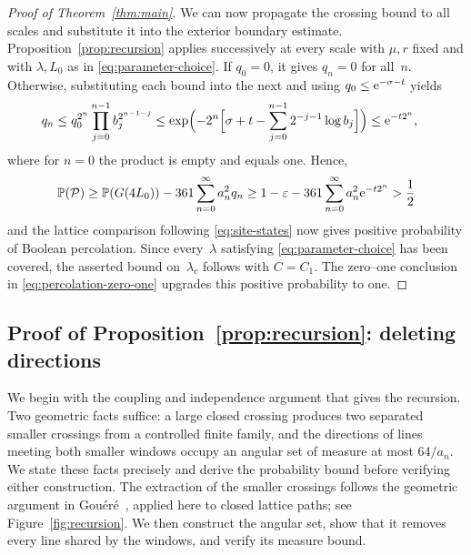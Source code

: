 \documentclass[11pt,letterpaper]{article}
\begin{document}
\begin{proof}[Proof of Theorem~\ref{thm:main}]
We can now propagate the crossing bound to all scales and substitute it into the exterior boundary estimate. Proposition~\ref{prop:recursion} applies successively at every scale with $\mu,r$ fixed and with $\lambda,L_0$ as in \eqref{eq:parameter-choice}. If $q_0=0$, it gives $q_n=0$ for all~$n$. Otherwise, substituting each bound into the next and using $q_0\le\mathrm{e}^{-\sigma-t}$ yields
\begin{align}\label{eq:iterated-crossing-bound}
  q_n&\le q_0^{2^n}\prod_{j=0}^{n-1}b_j^{2^{n-1-j}}\le\exp\Bigl(-2^n\Bigl[\sigma+t-\sum_{j=0}^{n-1}2^{-j-1}\log b_j\Bigr]\Bigr)\le\mathrm{e}^{-t2^n},
  \end{align}
where for $n=0$ the product is empty and equals one. Hence,
\begin{align*}
  \mathbb P(\mathcal P)\ge\mathbb P(G(4L_0))-361\sum_{n=0}^\infty a_n^2q_n\ge1-\varepsilon-361\sum_{n=0}^\infty a_n^2\mathrm{e}^{-t2^n}>\frac12
\end{align*}
and the lattice comparison following \eqref{eq:site-states} now gives positive probability of Boolean percolation. Since every~$\lambda$ satisfying \eqref{eq:parameter-choice} has been covered, the asserted bound on~$\lambda_c$ follows with $C=C_1$. The zero--one conclusion in \eqref{eq:percolation-zero-one} upgrades this positive probability to one.
\end{proof}

\subsection{Proof of \texorpdfstring{Proposition~\ref{prop:recursion}}{the recursion}: deleting directions}
\label{sec:recursion}

We begin with the coupling and independence argument that gives the recursion. Two geometric facts suffice: a large closed crossing produces two separated smaller crossings from a controlled finite family, and the directions of lines meeting both smaller windows occupy an angular set of measure at most $64/a_n$. We state these facts precisely and derive the probability bound before verifying either construction. The extraction of the smaller crossings follows the geometric argument in Gou\'er\'e~\cite[Lemma~3.3]{Gou08}, applied here to closed lattice paths; see Figure~\ref{fig:recursion}. We then construct the angular set, show that it removes every line shared by the windows, and verify its measure bound.
\end{document}
